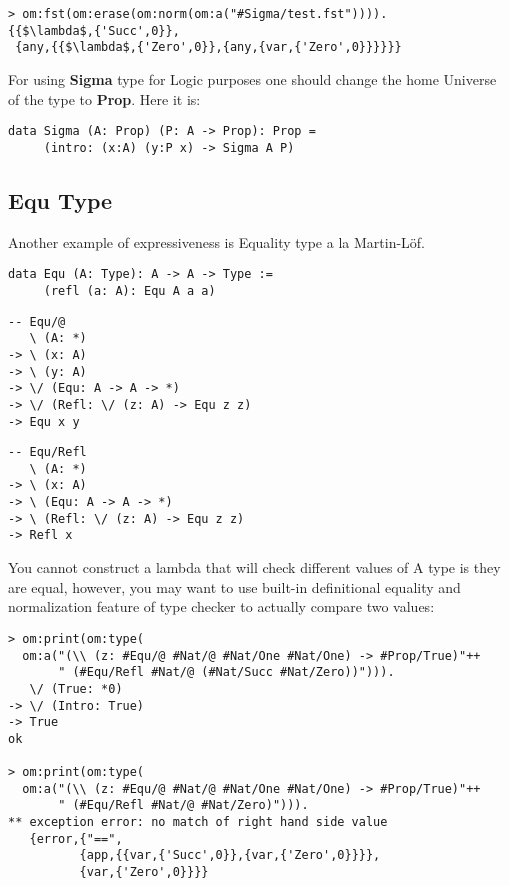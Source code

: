 \documentclass{article}
\begin{document}
\begin{lstlisting}[mathescape=true]
> om:fst(om:erase(om:norm(om:a("#Sigma/test.fst")))).
{{$\lambda$,{'Succ',0}},
 {any,{{$\lambda$,{'Zero',0}},{any,{var,{'Zero',0}}}}}}
\end{lstlisting}

For using {\bf Sigma} type for Logic purposes one should change the
home Universe of the type to {\bf Prop}. Here it is:

\begin{lstlisting}[mathescape=true]
data Sigma (A: Prop) (P: A -> Prop): Prop =
     (intro: (x:A) (y:P x) -> Sigma A P)
\end{lstlisting}

\subsection{Equ Type}
Another example of expressiveness is Equality type a la Martin-Löf.

\begin{lstlisting}
data Equ (A: Type): A -> A -> Type :=
     (refl (a: A): Equ A a a)
\end{lstlisting}

\begin{lstlisting}
-- Equ/@
   \ (A: *)
-> \ (x: A)
-> \ (y: A)
-> \/ (Equ: A -> A -> *)
-> \/ (Refl: \/ (z: A) -> Equ z z)
-> Equ x y
\end{lstlisting}

\begin{lstlisting}
-- Equ/Refl
   \ (A: *)
-> \ (x: A)
-> \ (Equ: A -> A -> *)
-> \ (Refl: \/ (z: A) -> Equ z z)
-> Refl x
\end{lstlisting}

You cannot construct a lambda that will check different values of A type is they are equal,
however, you may want to use built-in definitional equality and
normalization feature of type checker to actually compare two values:

\begin{lstlisting}[mathescape=true]
> om:print(om:type(
  om:a("(\\ (z: #Equ/@ #Nat/@ #Nat/One #Nat/One) -> #Prop/True)"++
       " (#Equ/Refl #Nat/@ (#Nat/Succ #Nat/Zero))"))).
   \/ (True: *0)
-> \/ (Intro: True)
-> True
ok

> om:print(om:type(
  om:a("(\\ (z: #Equ/@ #Nat/@ #Nat/One #Nat/One) -> #Prop/True)"++
       " (#Equ/Refl #Nat/@ #Nat/Zero)"))).
** exception error: no match of right hand side value
   {error,{"==",
          {app,{{var,{'Succ',0}},{var,{'Zero',0}}}},
          {var,{'Zero',0}}}}
\end{lstlisting}
\end{document}
